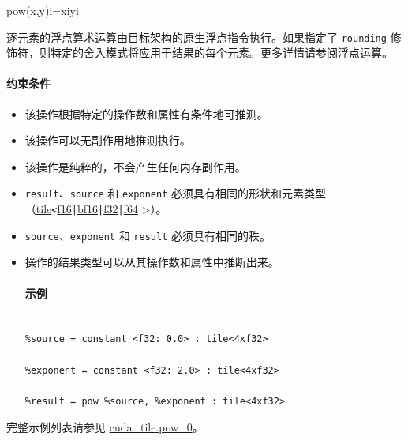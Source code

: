 \documentclass{article}
\begin{document}
pow(x,y)i=xiyi


逐元素的浮点算术运算由目标架构的原生浮点指令执行。如果指定了 \texttt{rounding} 修饰符，则特定的舍入模式将应用于结果的每个元素。更多详情请参阅\href{https://docs.nvidia.com/cuda/tile-ir/latest/sections/operations.html#op-group-floating-point}{浮点运算}。





\paragraph{约束条件}


\begin{itemize}
\item 该操作根据特定的操作数和属性有条件地可推测。
\item 该操作可以无副作用地推测执行。
\item 该操作是纯粹的，不会产生任何内存副作用。
\item \texttt{result}、\texttt{source} 和 \texttt{exponent} 必须具有相同的形状和元素类型（\href{https://docs.nvidia.com/cuda/tile-ir/latest/sections/types.html#type-tile}{tile}\texttt{<}\href{https://docs.nvidia.com/cuda/tile-ir/latest/sections/types.html#subsection-element-types}{f16}\texttt{|}\href{https://docs.nvidia.com/cuda/tile-ir/latest/sections/types.html#subsection-element-types}{bf16}\texttt{|}\href{https://docs.nvidia.com/cuda/tile-ir/latest/sections/types.html#subsection-element-types}{f32}\texttt{|}\href{https://docs.nvidia.com/cuda/tile-ir/latest/sections/types.html#subsection-element-types}{f64} >）。
\item \texttt{source}、\texttt{exponent} 和 \texttt{result} 必须具有相同的秩。
\item 操作的结果类型可以从其操作数和属性中推断出来。




\paragraph{示例}


\begin{lstlisting}

%source = constant <f32: 0.0> : tile<4xf32>

%exponent = constant <f32: 2.0> : tile<4xf32>

%result = pow %source, %exponent : tile<4xf32>

\end{lstlisting}



\end{itemize}
完整示例列表请参见 \href{https://docs.nvidia.com/cuda/tile-ir/latest/sections/appendix.html#example-cuda-tile-pow-0}{cuda\_tile.pow\_0}。
\end{document}
